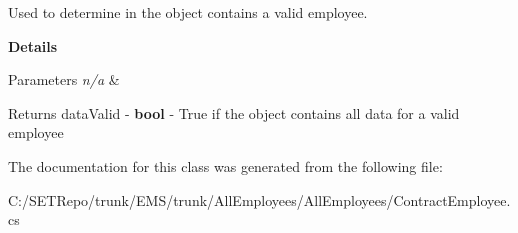 Used to determine in the object contains a valid employee. 

{\bfseries Details}


\begin{DoxyParams}{Parameters}
{\em n/a} & \\
\hline
\end{DoxyParams}
\begin{DoxyReturn}{Returns}
data\+Valid -\/ {\bfseries bool} -\/ True if the object contains all data for a valid employee 
\end{DoxyReturn}


The documentation for this class was generated from the following file\+:\begin{DoxyCompactItemize}
\item 
C\+:/\+S\+E\+T\+Repo/trunk/\+E\+M\+S/trunk/\+All\+Employees/\+All\+Employees/Contract\+Employee.\+cs\end{DoxyCompactItemize}

